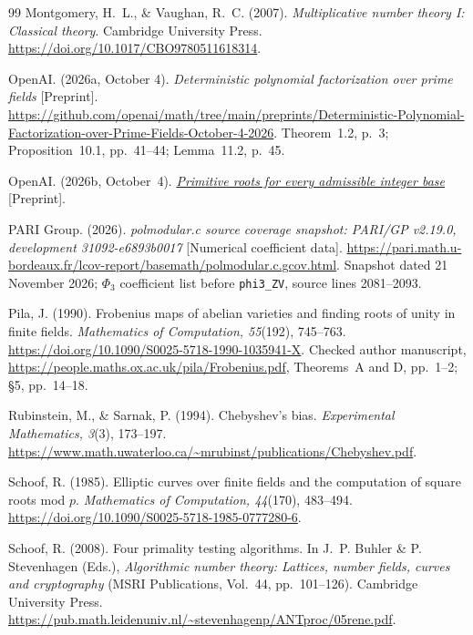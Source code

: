 \documentclass[11pt]{article}
\theoremstyle{definition}
\theoremstyle{remark}
\begin{document}
\begin{thebibliography}{99}
Montgomery, H.~L., \& Vaughan, R.~C. (2007).
\emph{Multiplicative number theory I: Classical theory}.
Cambridge University Press.
\url{https://doi.org/10.1017/CBO9780511618314}.

OpenAI. (2026a, October 4).
\emph{Deterministic polynomial factorization over prime fields}
[Preprint].
\url{https://github.com/openai/math/tree/main/preprints/Deterministic-Polynomial-Factorization-over-Prime-Fields-October-4-2026}.
Theorem~1.2, p.~3; Proposition~10.1, pp.~41--44;
Lemma~11.2, p.~45.

OpenAI. (2026b, October~4).
\emph{\href{https://raw.githubusercontent.com/openai/math/main/preprints/Primitive-roots-for-every-admissible-integer-base-October-4-2026/primitive-roots-all-integer-bases.pdf}{Primitive roots for every admissible integer base}}
[Preprint].

PARI Group. (2026).
\emph{polmodular.c source coverage snapshot: PARI/GP v2.19.0,
development 31092-e6893b0017} [Numerical coefficient data].
\url{https://pari.math.u-bordeaux.fr/lcov-report/basemath/polmodular.c.gcov.html}.
Snapshot dated 21 November 2026; $\Phi_3$ coefficient list before
\texttt{phi3\_ZV}, source lines 2081--2093.

Pila, J. (1990).
Frobenius maps of abelian varieties and finding roots of unity in finite fields.
\emph{Mathematics of Computation, 55}(192), 745--763.
\url{https://doi.org/10.1090/S0025-5718-1990-1035941-X}.
Checked author manuscript, \url{https://people.maths.ox.ac.uk/pila/Frobenius.pdf},
Theorems~A and D, pp.~1--2; \S5, pp.~14--18.

Rubinstein, M., \& Sarnak, P. (1994). Chebyshev's bias.
\emph{Experimental Mathematics, 3}(3), 173--197.
\url{https://www.math.uwaterloo.ca/~mrubinst/publications/Chebyshev.pdf}.

Schoof, R. (1985).
Elliptic curves over finite fields and the computation of square roots mod $p$.
\emph{Mathematics of Computation, 44}(170), 483--494.
\url{https://doi.org/10.1090/S0025-5718-1985-0777280-6}.

Schoof, R. (2008). Four primality testing algorithms.
In J.~P. Buhler \& P. Stevenhagen (Eds.),
\emph{Algorithmic number theory: Lattices, number fields, curves and cryptography}
(MSRI Publications, Vol.~44, pp.~101--126). Cambridge University Press.
\url{https://pub.math.leidenuniv.nl/~stevenhagenp/ANTproc/05rene.pdf}.


\end{thebibliography}
\end{document}
